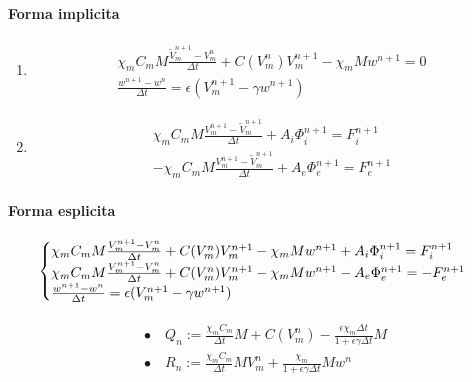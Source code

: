 \documentclass[a4paper]{article}
\theoremstyle{definition}
\begin{document}
\paragraph{Forma implicita}
\begin{enumerate}[label = \Roman*, align = Center]
	\item 
	\begin{equation}
	\begin{gathered}
	\chi_m C_m M \frac{\tilde{V}_m^{n+1}-V_m^n}{\Delta t} +  C(V_m^n) V_m^{n+1} - \chi_m M w^{n+1}= 0
	\\
	 \frac{w^{n+1} - w^n}{\Delta t} = \epsilon (V_m^{n+1}-\gamma w^{n+1})
	\end{gathered}
	\end{equation}
	\item 
	\begin{equation}
	\begin{gathered}
	\chi_m C_m M \frac{V_m^{n+1}-\tilde{V}_m^{n+1}}{\Delta t} + A_i \Phi_i^{n+1}= F_i^{n+1}
	\\
	- \chi_m C_m M \frac{V_m^{n+1}-\tilde{V}_m^{n+1}}{\Delta t} + A_e \Phi_e^{n+1}= F_e^{n+1}
	\end{gathered}
	\end{equation}
	
\end{enumerate}
\vspace{5mm}
\paragraph{Forma esplicita}
\begin{equation}
\vspace{5mm}
\begin{cases}
\chi_m C_m M \frac{V_m^{n+1}-V_m^{n}}{\Delta t} + C(V_m^n) V_m^{n+1} - \chi_m M w^{n+1} + A_i \Phi_i ^{n+1} = F_i^{n+1} \\
\chi_m C_m M \frac{V_m^{n+1}-V_m^{n}}{\Delta t} +  C(V_m^n) V_m^{n+1} - \chi_m M w^{n+1} - A_e \Phi_e ^{n+1} =  -F_e^{n+1} \\
\frac{w^{n+1}-w^{n}}{\Delta t} = \epsilon(V_m^{n+1}-\gamma w^{n+1})
\end{cases}
\end{equation}

 \begin{equation}
 \begin{gathered}
 \begin{aligned}
 & \bullet \quad Q_n := \frac{\chi_m C_m}{\Delta t}M + C(V_m^n) - \frac{\epsilon\chi_m \Delta t}{1 + \epsilon \gamma \Delta t} M \\
 & \bullet \quad R_n := \frac{\chi_mC_m}{\Delta t}MV_m^n + \frac{\chi_m}{1+\epsilon\gamma\Delta t}M w^n
 \end{aligned}
 \end{gathered}
\end{equation}
\end{document}
